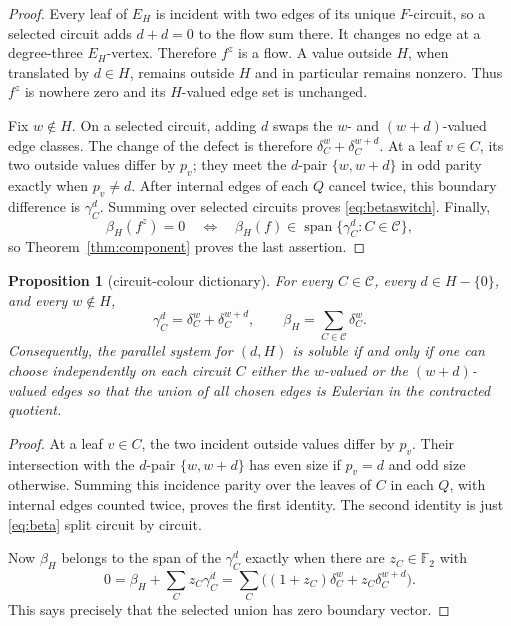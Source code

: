 \documentclass[11pt]{article}
\newtheorem{proposition}[theorem]{Proposition}
\theoremstyle{definition}
\theoremstyle{remark}
\newcommand{\F}{\mathbb F}
\newcommand{\C}{\mathcal C}
\newcommand{\Span}{\operatorname{span}}
\numberwithin{equation}{section}
\begin{document}
\begin{proof}
Every leaf of \(E_H\) is incident with two edges of its unique
\(F\)-circuit, so a selected circuit adds \(d+d=0\) to the flow sum
there.  It changes no edge at a degree-three \(E_H\)-vertex.  Therefore
\(f^z\) is a flow.  A value outside \(H\), when translated by
\(d\in H\), remains outside \(H\) and in particular remains nonzero.
Thus \(f^z\) is nowhere zero and its \(H\)-valued edge set is unchanged.

Fix \(w\notin H\).  On a selected circuit, adding \(d\) swaps the
\(w\)- and \((w+d)\)-valued edge classes.  The change of the defect is
therefore \(\delta_C^w+\delta_C^{w+d}\).  At a leaf \(v\in C\), its two
outside values differ by \(p_v\); they meet the \(d\)-pair
\(\{w,w+d\}\) in odd parity exactly when \(p_v\ne d\).  After internal
edges of each \(Q\) cancel twice, this boundary difference is
\(\gamma_C^d\).  Summing over selected circuits proves
\eqref{eq:betaswitch}.  Finally,
\[
 \beta_H(f^z)=0
 \quad\Longleftrightarrow\quad
 \beta_H(f)\in\Span\{\gamma_C^d:C\in\C\},
\]
so Theorem~\ref{thm:component} proves the last assertion.
\end{proof}

\begin{proposition}[circuit-colour dictionary]\label{prop:dictionary}
For every \(C\in\C\), every \(d\in H-\{0\}\), and every \(w\notin H\),
\begin{equation}
 \gamma_C^d=\delta_C^w+\delta_C^{w+d},
 \qquad
 \beta_H=\sum_{C\in\C}\delta_C^w.                            \label{eq:dictionary}
\end{equation}
Consequently, the parallel system for \((d,H)\) is soluble if and only
if one can choose independently on each circuit \(C\) either the
\(w\)-valued or the \((w+d)\)-valued edges so that the union of all
chosen edges is Eulerian in the contracted quotient.
\end{proposition}

\begin{proof}
At a leaf \(v\in C\), the two incident outside values differ by
\(p_v\).  Their intersection with the \(d\)-pair
\(\{w,w+d\}\) has even size if \(p_v=d\) and odd size otherwise.
Summing this incidence parity over the leaves of \(C\) in each \(Q\),
with internal edges counted twice, proves the first identity.  The
second identity is just \eqref{eq:beta} split circuit by circuit.

Now \(\beta_H\) belongs to the span of the \(\gamma_C^d\) exactly when
there are \(z_C\in\F_2\) with
\[
 0=\beta_H+\sum_C z_C\gamma_C^d
  =\sum_C\bigl((1+z_C)\delta_C^w+
                     z_C\delta_C^{w+d}\bigr).
\]
This says precisely that the selected union has zero boundary vector.
\end{proof}
\end{document}
